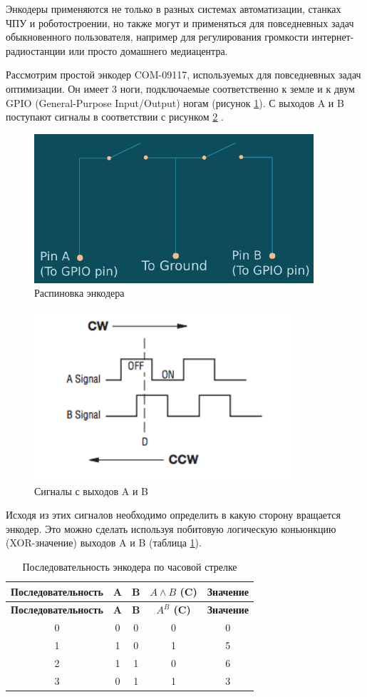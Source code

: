 Энкодеры применяются не только в разных системах автоматизации, станках ЧПУ и роботостроении, но также могут и применяться для повседневных задач обыкновенного пользователя, например для регулирования громкости интернет-радиостанции или просто домашнего медиацентра.

Рассмотрим простой энкодер COM-09117, используемых для повседневных задач оптимизации. Он имеет 3 ноги, подключаемые соответственно к земле и к двум GPIO (General-Purpose Input/Output) ногам (рисунок \ref{fig:pins}). С выходов A и B поступают сигналы в соответствии с рисунком \ref{fig:signals} \cite{bob:rpirotary}.

\begin{figure}[ht]
    \includegraphics[width=.5\linewidth]{Figures/pins.png}
    \caption{Распиновка энкодера}
    \label{fig:pins}
\end{figure}

\begin{figure}[ht]
    \includegraphics[width=.5\linewidth]{Figures/signals.png}
    \caption{Сигналы с выходов A и B}
    \label{fig:signals}
\end{figure}

Исходя из этих сигналов необходимо определить в какую сторону вращается энкодер. Это можно сделать используя побитовую логическую коньюнкцию (XOR-значение) выходов A и B (таблица \ref{tab:xor}).

\begin{longtable}[c]{|c|c|c|c|c|}
    \caption{Последовательность энкодера по часовой стрелке}
    \label{tab:xor}\\
    \hline
    \textbf{Последовательность} & \textbf{A} & \textbf{B} & \textbf{$A\land B$ (C)} & \textbf{Значение}\\
    \hline
    \endfirsthead
    \hline
    \textbf{Последовательность} & \textbf{A} & \textbf{B} & \textbf{$A^B$ (C)} & \textbf{Значение}\\
    \hline
    \endhead
        0 & 0 & 0 & 0 & 0\\
        \hline
        1 & 1 & 0 & 1 & 5\\
        \hline
        2 & 1 & 1 & 0 & 6\\
        \hline
        3 & 0 & 1 & 1 & 3\\
        \hline
\end{longtable}

